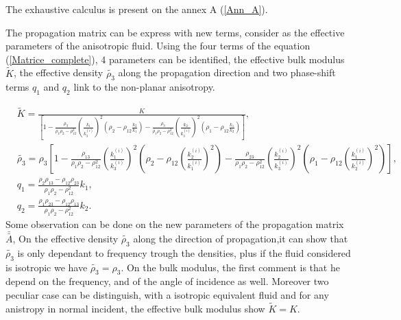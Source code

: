 \documentclass{article}
\begin{document}
    The exhaustive calculus is present on the annex A (\ref{Ann_A}).
    
    The propagation matrix can be express with new terms, consider as the effective parameters of the anisotropic fluid. Using the four terms of the equation (\ref{Matrice_complete}), 4 parameters can be identified, the effective bulk modulus $\tilde{K}$, the effective density $\tilde{\rho_3}$ along the propagation direction and two phase-shift terms $q_1$ and $q_2$ link to the non-planar anisotropy.
    
    \begin{align}
     &\tilde{K}=\frac{K}{[1-\frac{\rho_3}{\rho_1\rho_2-\rho_{12}^2}(\frac{k_1}{k_3^{(i)}})^2(\rho_2-\rho_{12}\frac{k_2}{k_1})-\frac{\rho_3}{\rho_1\rho_2-\rho_{12}^2}(\frac{k_2}{k_3^{(i)}})^2(\rho_1-\rho_{12}\frac{k_1}{k_2})]}\label{Ktild},\\
     &\tilde{\rho_3}=\rho_3[1-\frac{\rho_{13}}{\rho_1\rho_2-\rho_{12}^2}(\frac{k_1^{(i)}}{k_3^{(i)}})^2(\rho_2-\rho_{12}(\frac{k_2^{(i)}}{k_1^{(i)}})^2)-\frac{\rho_{23}}{\rho_{1}\rho_2-\rho_{12}^2}(\frac{k_2^{(i)}}{k_3^{(i)}})^2(\rho_1-\rho_{12}(\frac{k_1^{(i)}}{k_2^{(i)}})^2)]\label{rho3tild}, \\
	&q_{1}=\frac{\rho_2\rho_{13}-\rho_{12}\rho_{23}}{\rho_1\rho_2-\rho_{12}^2}k_1\label{q1},\\
    &q_{2}= \frac{\rho_1\rho_{23}-\rho_{12}\rho_{13}}{\rho_1\rho_2-\rho_{12}^2}k_2\label{q2}.
          \end{align}
          Some observation can be done on the new parameters of the propagation matrix $\bar{\bar{A}}$, On the effective density $\tilde{\rho_3}$ along the direction of propagation,it can show that $\tilde{\rho_3}$ is only dependant to frequency trough the densities, plus if the fluid considered is isotropic we have $\tilde{\rho_3}=\rho_3$. On the bulk modulus, the first comment is that he depend on the frequency, and of the angle of incidence as well. Moreover two peculiar case can be distinguish, with a isotropic equivalent fluid and for any anistropy in normal incident, the effective bulk modulus show $\tilde{K}=K$. %
          
\end{document}
